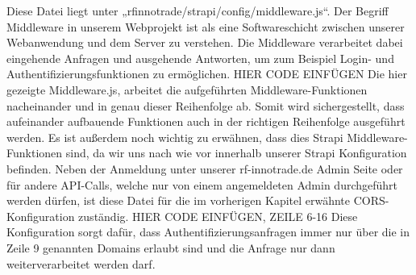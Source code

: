 Diese Datei liegt unter „rfinnotrade/strapi/config/middleware.js“.
Der Begriff Middleware in unserem Webprojekt ist als eine Softwareschicht zwischen unserer Webanwendung und dem Server zu verstehen. Die Middleware verarbeitet dabei eingehende Anfragen und ausgehende Antworten, um zum Beispiel Login- und Authentifizierungsfunktionen zu ermöglichen.
HIER CODE EINFÜGEN
Die hier gezeigte Middleware.js, arbeitet die aufgeführten Middleware-Funktionen nacheinander und in genau dieser Reihenfolge ab. Somit wird sichergestellt, dass aufeinander aufbauende Funktionen auch in der richtigen Reihenfolge ausgeführt werden. Es ist außerdem noch wichtig zu erwähnen, dass dies Strapi Middleware-Funktionen sind, da wir uns nach wie vor innerhalb unserer Strapi Konfiguration befinden.
Neben der Anmeldung unter unserer rf-innotrade.de Admin Seite oder für andere API-Calls, welche nur von einem angemeldeten Admin durchgeführt werden dürfen, ist diese Datei für die im vorherigen Kapitel erwähnte CORS-Konfiguration zuständig.
HIER CODE EINFÜGEN, ZEILE 6-16
Diese Konfiguration sorgt dafür, dass Authentifizierungsanfragen immer nur über die in Zeile 9 genannten Domains erlaubt sind und die Anfrage nur dann weiterverarbeitet werden darf.
